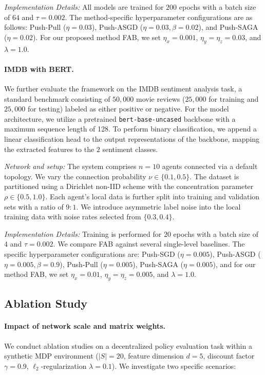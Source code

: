 \documentclass{article}
\theoremstyle{plain}
\theoremstyle{definition}
\theoremstyle{remark}
\begin{document}
\textit{Implementation Details:} All models are trained for $200$ epochs with a batch size of $64$ and $\tau=0.002$. The method-specific hyperparameter configurations are as follows: Push-Pull ($\eta=0.03$), Push-ASGD ($\eta=0.03, \beta=0.02$), and Push-SAGA ($\eta=0.02$). For our proposed method FAB, we set $\eta_x=0.001$, $\eta_y=\eta_z=0.03$, and $\lambda=1.0$.

\paragraph{IMDB with BERT.}
We further evaluate the framework on the IMDB sentiment analysis task, a standard benchmark consisting of $50,000$ movie reviews ($25,000$ for training and $25,000$ for testing) labeled as either positive or negative. For the model architecture, we utilize a pretrained \texttt{bert-base-uncased} backbone with a maximum sequence length of 128. To perform binary classification, we append a linear classification head to the output representations of the backbone, mapping the extracted features to the $2$ sentiment classes.

\textit{Network and setup:} The system comprises $n=10$ agents connected via a default topology. We vary the connection probability $\nu \in \{0.1, 0.5\}$. The dataset is partitioned using a Dirichlet non-IID scheme with the concentration parameter $\rho \in \{ 0.5, 1.0\}$.   Each agent's local data is further split into training and validation sets with a ratio of $9:1$. We introduce asymmetric label noise into the local training data with noise rates selected from $\{0.3, 0.4\}$. 

\textit{Implementation Details:} Training is performed for $20$ epochs with a batch size of $4$ and $\tau=0.002$. We compare FAB against several single-level baselines. The specific hyperparameter configurations are: Push-SGD ($\eta=0.005$), Push-ASGD ($\eta=0.005, \beta=0.9$), Push-Pull ($\eta=0.005$), Push-SAGA ($\eta=0.005$), and for our method FAB, we set $\eta_x=0.01$, $\eta_y=\eta_z=0.005$, and $\lambda=1.0$.


\subsection{Ablation Study}
\label{app:details_ablation}

\paragraph{Impact of network scale and matrix weights.}
We conduct ablation studies on a decentralized policy evaluation task within a synthetic MDP environment ($|S|=20$, feature dimension $d=5$, discount factor $\gamma=0.9$, $\ell_2$-regularization $\lambda=0.1$).  We investigate two specific scenarios:
\end{document}
